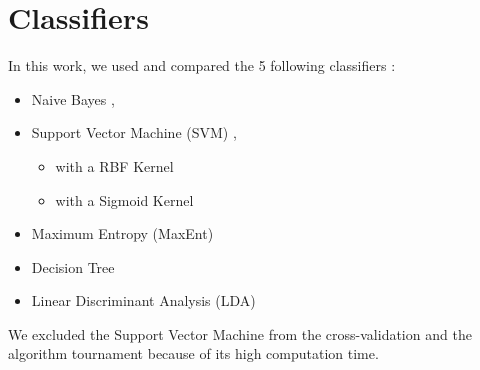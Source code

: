 \section{Classifiers}
\label{sec:classifiers}

In this work, we used and compared the 5 following classifiers :

\begin{itemize}
 \item Naive Bayes \cite{jurafsky2000speech}, \cite{kalousis2013}
 \item {Support Vector Machine (SVM) \cite{cristianini2000introduction},
	\cite{kalousis2013}
	\begin{itemize}
	 \item with a RBF Kernel
	 \item with a Sigmoid Kernel
	\end{itemize}}
 \item Maximum Entropy (MaxEnt)\cite{jurafsky2000speech}
 \item Decision Tree \cite{kalousis2013}
 \item Linear Discriminant Analysis (LDA) \cite{kalousis2013}
\end{itemize}

We excluded the Support Vector Machine from the cross-validation and 
the algorithm tournament because of its high computation time.